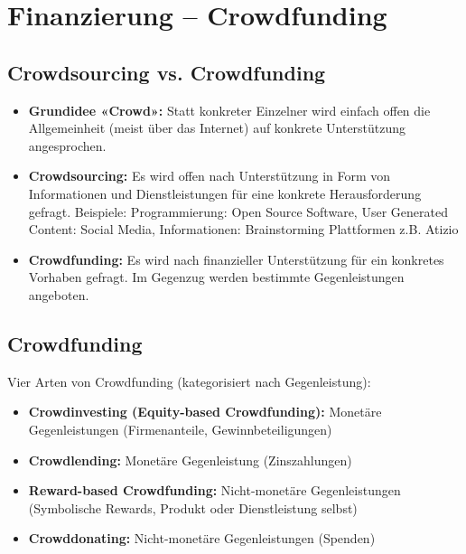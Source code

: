 \section{Finanzierung – Crowdfunding}
\subsection{Crowdsourcing vs. Crowdfunding}
\begin{itemize}
	\item \textbf{Grundidee «Crowd»:} Statt konkreter Einzelner wird einfach offen die Allgemeinheit (meist über das Internet) auf konkrete Unterstützung angesprochen.
	\item \textbf{Crowdsourcing:} Es wird offen nach Unterstützung in Form von Informationen und Dienstleistungen für eine konkrete Herausforderung gefragt. Beispiele: Programmierung: Open Source Software, User Generated Content: Social Media, Informationen: Brainstorming Plattformen z.B. Atizio
	\item \textbf{Crowdfunding:} Es wird nach finanzieller Unterstützung für ein konkretes Vorhaben gefragt. Im Gegenzug werden bestimmte Gegenleistungen angeboten.
\end{itemize}

\subsection{Crowdfunding}
Vier Arten von Crowdfunding (kategorisiert nach Gegenleistung):
\begin{itemize}
	\item \textbf{Crowdinvesting (Equity-based Crowdfunding):} Monetäre Gegenleistungen (Firmenanteile, Gewinnbeteiligungen)
	\item \textbf{Crowdlending:} Monetäre Gegenleistung (Zinszahlungen)
	\item \textbf{Reward-based Crowdfunding:} Nicht-monetäre Gegenleistungen (Symbolische Rewards, Produkt oder Dienstleistung selbst)
	\item \textbf{Crowddonating:} Nicht-monetäre Gegenleistungen (Spenden)
\end{itemize}

